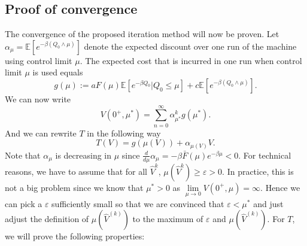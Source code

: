\subsection{Proof of convergence}
The convergence of the proposed iteration method will now be proven.
Let $\alpha_\mu=\mathbb{E}[e^{-\beta (Q_0\wedge\mu)}]$ denote the expected discount over one run of the machine using control limit $\mu$.
The expected cost that is incurred in one  run when control limit $\mu$ is used equals
$$
g(\mu):=aF(\mu)\mathbb{E}[e^{-\beta Q_0}|Q_0\leq \mu]+c\mathbb{E}[e^{-\beta(Q_0\wedge\mu)}].
$$
We can now write
$$
V(0^+,\mu^*)=\sum\limits_{n=0}^\infty \alpha_{\mu^*}^kg(\mu^*).
$$
And we can rewrite $T$ in the following way
\[
T(V)=g(\mu(V))+\alpha_{\mu(V)}V.
\]
Note that $\alpha_\mu$ is decreasing in $\mu$ since $\frac{d}{d\mu}\alpha_\mu=-\beta\bar F(\mu)e^{-\beta \mu}<0$.
For technical reasons, we have to assume that for all $\hat{V}^{k}$, $\mu(\hat{V}^{k})\geq\varepsilon>0$.
In practice, this is not a big problem since we know that $\mu^*>0$ as $\lim\limits_{\mu\rightarrow 0}V(0^+,\mu)=\infty$.
Hence we can pick a $\varepsilon$ sufficiently small so that we are convinced that $\varepsilon<\mu^*$ and just adjust the definition of $\mu(\hat{V}^{(k)})$ to the maximum of $\varepsilon$ and $\mu(\hat{V}^{(k)})$.
For $T$, we will prove the following properties:
